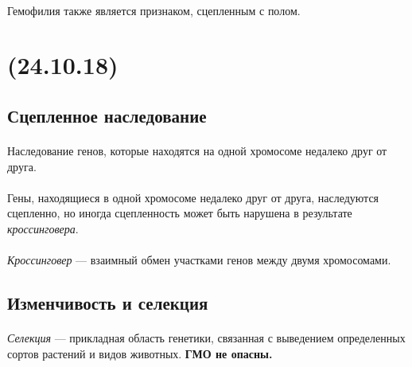\documentclass[dvipdfmx]{article}
\begin{document}
\paragraph{}
Гемофилия также является признаком, сцепленным с полом. 

\newpage
\noindent\makebox[\linewidth]{\rule{\paperwidth}{0.4pt}}
\section{(24.10.18)}
\noindent\makebox[\linewidth]{\rule{\paperwidth}{0.4pt}}

\subsection{Сцепленное наследование}

\paragraph{}
Наследование генов, которые находятся на одной хромосоме недалеко друг от друга.

\paragraph{}
Гены, находящиеся в одной хромосоме недалеко друг от друга, наследуются сцепленно, но иногда сцепленность может быть
нарушена в результате \emph{кроссинговера}.

\paragraph{}
\emph{Кроссинговер} --- взаимный обмен участками генов между двумя хромосомами.

\subsection{Изменчивость и селекция}

\paragraph{}
\emph{Селекция} --- прикладная область генетики, связанная с выведением определенных сортов растений и видов животных.
\textbf{ГМО не опасны.}
\end{document}
